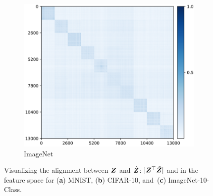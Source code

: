 \documentclass[../../book-main.tex]{subfiles}
\begin{document}
\begin{figure}[t]
\begin{subfigure}[t]{0.3\textwidth}
    \end{subfigure}
    \hfill
    \begin{subfigure}[t]{0.3\textwidth}
        \centering
        \includegraphics[width=\textwidth]{chapters/chapter5/figs/Imagenet_heatmat_epoch200000.png}
        \caption{ImageNet}
    \end{subfigure}
    \caption{{Visualizing} %
    the alignment between $\bm{Z}$ and $\hat{\bm{Z}}$: $|\bm{Z}^\top \hat{\bm{Z}}|$ and  in the feature space for (\textbf{a}) MNIST, (\textbf{b}) CIFAR-10, and~(\textbf{c}) ImageNet-10-Class.}
    \label{fig:justifyz=z}
\end{figure}
 


\end{document}
